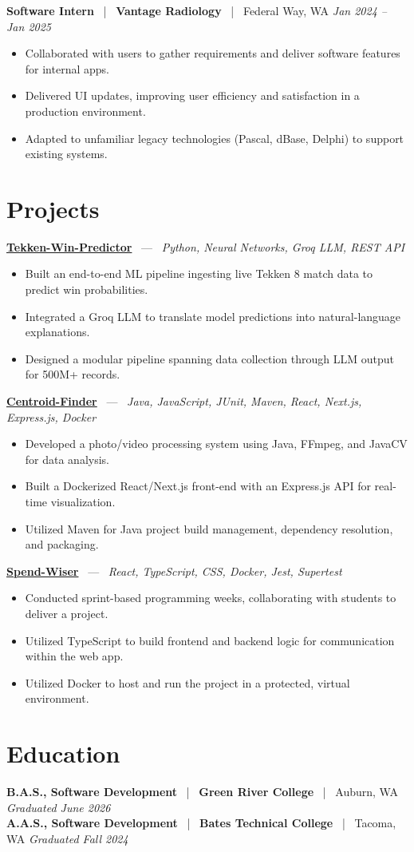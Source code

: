\documentclass[10pt, letterpaper]{article}
\newcommand{\jobhead}[4]{%
  \vspace{5pt}%
  {\bfseries\color{dark}#1}%
  ~{\color{light}|}~%
  {\bfseries\color{navy}#2}%
  ~{\color{light}|}~%
  {\color{light}#3}%
  \hfill{\color{light}\small\textit{#4}}\\[-2pt]%
}
\newcommand{\projhead}[3]{%
  \vspace{5pt}%
  {\bfseries\color{dark}\href{#2}{#1}}%
  ~{\color{light}---}~%
  {\color{light}\small\textit{#3}}\\[-2pt]%
}
\begin{document}
\jobhead{Software Intern}{Vantage Radiology}{Federal Way, WA}{Jan 2024 – Jan 2025}
\begin{itemize}
  \item Collaborated with users to gather requirements and deliver software features for internal apps.
  \item Delivered UI updates, improving user efficiency and satisfaction in a production environment.
  \item Adapted to unfamiliar legacy technologies (Pascal, dBase, Delphi) to support existing systems.
\end{itemize}

\section{Projects}

\projhead{Tekken-Win-Predictor}{}{Python, Neural Networks, Groq LLM, REST API}
\begin{itemize}
  \item Built an end-to-end ML pipeline ingesting live Tekken 8 match data to predict win probabilities.
  \item Integrated a Groq LLM to translate model predictions into natural-language explanations.
  \item Designed a modular pipeline spanning data collection through LLM output for 500M+ records.
\end{itemize}

\projhead{Centroid-Finder}{https://github.com/xavierb117/centroid-finder}{Java, JavaScript, JUnit, Maven, React, Next.js, Express.js, Docker}
\begin{itemize}
  \item Developed a photo/video processing system using Java, FFmpeg, and JavaCV for data analysis.
  \item Built a Dockerized React/Next.js front-end with an Express.js API for real-time visualization.
  \item Utilized Maven for Java project build management, dependency resolution, and packaging.
\end{itemize}

\projhead{Spend-Wiser}{https://github.com/JesseChum/w26-sdev372-spendwiser-finance-tracker}{React, TypeScript, CSS, Docker, Jest, Supertest}
\begin{itemize}
  \item Conducted sprint-based programming weeks, collaborating with students to deliver a project.
  \item Utilized TypeScript to build frontend and backend logic for communication within the web app.
  \item Utilized Docker to host and run the project in a protected, virtual environment.
\end{itemize}

\section{Education}

\jobhead{B.A.S., Software Development}{Green River College}{Auburn, WA}{Graduated June 2026}
\jobhead{A.A.S., Software Development}{Bates Technical College}{Tacoma, WA}{Graduated Fall 2024}
\end{document}
